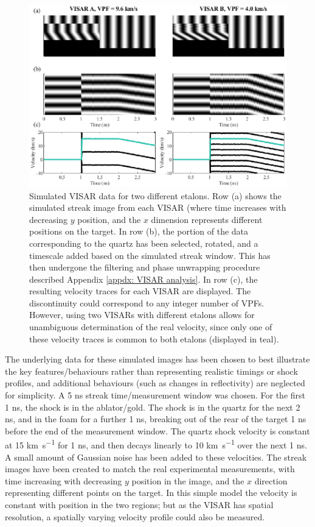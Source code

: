 \begin{figure}
\includegraphics[width=1.0\textwidth]{figures/Experiment/VISARToy.eps}%
\caption{\label{fig:VISARToy} Simulated VISAR data for two different etalons. Row (a) shows the simulated streak image from each VISAR (where time increases with decreasing $y$ position, and the $x$ dimension represents different positions on the target. In row (b), the portion of the data corresponding to the quartz has been selected, rotated, and a timescale added based on the simulated streak window. This has then undergone the filtering and phase unwrapping procedure described Appendix \ref{appdx: VISAR analysis}. In row (c), the resulting velocity traces for each VISAR are displayed. The discontinuity could correspond to any integer number of VPFs. However, using two VISARs with different etalons allows for unambiguous determination of the real velocity, since only one of these velocity traces is common to both etalons (displayed in teal).}
\end{figure}

The underlying data for these simulated images has been chosen to best illustrate the key features/behaviours rather than representing realistic timings or shock profiles, and additional behaviours (such as changes in reflectivity) are neglected for simplicity. A 5 \unit{\nano\second} streak time/measurement window was chosen. For the first 1 \unit{\nano\second}, the shock is in the ablator/gold. The shock is in the quartz for the next 2 \unit{\nano\second}, and in the foam for a further 1 \unit{\nano\second}, breaking out of the rear of the target 1 \unit{\nano\second} before the end of the measurement window. The quartz shock velocity is constant at 15 \unit{\kilo\meter\per\second} for 1 \unit{\nano\second}, and then decays linearly to 10 \unit{\kilo\meter\per\second} over the next 1 \unit{\nano\second}. A small amount of Gaussian noise has been added to these velocities. The streak images have been created to match the real experimental measurements, with time increasing with decreasing $y$ position in the image, and the $x$ direction representing different points on the target. In this simple model the velocity is constant with position in the two regions; but as the VISAR has spatial resolution, a spatially varying velocity profile could also be measured.

